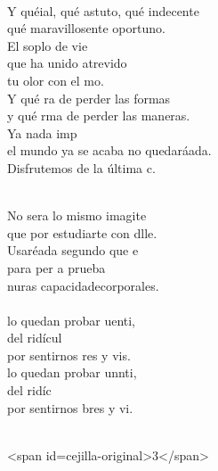 \begin{cancion}
	   \\
	Y quéial, qué astuto, qué indecente\\
	qué maravillosente oportuno.\\
	El soplo de vie\\
que ha unido atrevido\\
	tu olor con el mo.\\
	Y qué ra de perder las formas\\
	y qué rma de perder las maneras.\\
	Ya nada imp \\
	el mundo ya se acaba no quedaráada.\\
	Disfrutemos de la última c.  \\\jump\\
	\begin{chorus}%
	No sera lo mismo imagite\\
	que por estudiarte con dlle.\\
	Usaréada segundo que e\\
	para per a prueba \\
	nuras capacidadecorporales.\\
\jump\\
	lo quedan probar uenti,\\
	del ridícul\\
	por sentirnos res y vis.\\
	lo quedan probar unnti,\\
	del ridíc\\
	por sentirnos bres y vi.\\
	\end{chorus}%
	\jump\\
<span id=cejilla-original>3</span>\\
\end{cancion}%
